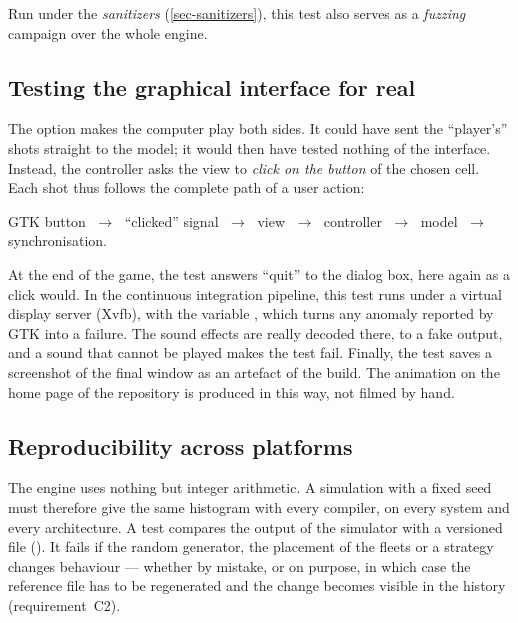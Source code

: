 Run under the \emph{sanitizers} (\cref{sec-sanitizers}), this test also serves as a
\emph{fuzzing} campaign over the whole engine.

\subsection{Testing the graphical interface for real}

The  option makes the computer play both sides. It could have sent the
\enquote{player's} shots straight to the model; it would then have tested nothing of the
interface. Instead, the controller asks the view to \emph{click on the button} of the chosen
cell. Each shot thus follows the complete path of a user action:

\begin{center}
    GTK button $\;\rightarrow\;$ \enquote{clicked} signal $\;\rightarrow\;$ view
    $\;\rightarrow\;$ controller $\;\rightarrow\;$ model $\;\rightarrow\;$ synchronisation.
\end{center}

At the end of the game, the test answers \enquote{quit} to the dialog box, here again as a
click would. In the continuous integration pipeline, this test runs under a virtual display
server (Xvfb), with the variable , which turns any anomaly
reported by GTK into a failure. The sound effects are really decoded there, to a fake output,
and a sound that cannot be played makes the test fail. Finally, the test saves a screenshot
of the final window as an artefact of the build. The animation on the home page of the
repository is produced in this way, not filmed by hand.

\subsection{Reproducibility across platforms}

The engine uses nothing but integer arithmetic. A simulation with a fixed seed must therefore
give the same histogram with every compiler, on every system and every architecture. A test
compares the output of the simulator with a versioned file
(). It fails if the random generator, the placement
of the fleets or a strategy changes behaviour --- whether by mistake, or on purpose, in which
case the reference file has to be regenerated and the change becomes visible in the history
(requirement~C2).

